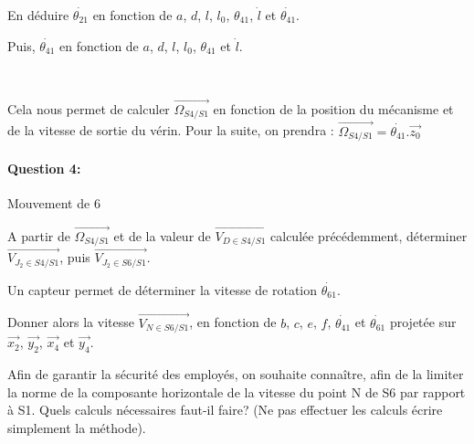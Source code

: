 En déduire $\dot{\theta_{21}}$ en fonction de $a$, $d$, $l$, $l_0$, $\theta_{41}$, $\dot{l}$ et $\dot{\theta_{41}}$.

Puis, $\dot{\theta_{41}}$ en fonction de $a$, $d$, $l$, $l_0$, $\theta_{41}$ et $\dot{l}$.

~\

Cela nous permet de calculer $\overrightarrow{\Omega_{S4/S1}}$ en fonction de la position du mécanisme et de la vitesse de sortie du vérin. Pour la suite, on prendra : $\overrightarrow{\Omega_{S4/S1}}=\dot{\theta_{41}}.\overrightarrow{z_0}$

\paragraph{Question 4:} Mouvement de 6

A partir de $\overrightarrow{\Omega_{S4/S1}}$ et de la valeur de $\overrightarrow{V_{D \in S4/S1}}$ calculée précédemment, déterminer $\overrightarrow{V_{J_2 \in S4/S1}}$, puis $\overrightarrow{V_{J_2 \in S6/S1}}$.

Un capteur permet de déterminer la vitesse de rotation $\dot{\theta_{61}}$.

Donner alors la vitesse $\overrightarrow{V_{N \in S6/S1}}$, en fonction de $b$, $c$, $e$, $f$, $\dot{\theta_{41}}$ et $\dot{\theta_{61}}$ projetée sur $\overrightarrow{x_2}$, $\overrightarrow{y_2}$, $\overrightarrow{x_4}$ et $\overrightarrow{y_4}$.

Afin de garantir la sécurité des employés, on souhaite connaître, afin de la limiter la norme de la composante horizontale de la vitesse du point N de S6 par rapport à S1. Quels calculs nécessaires faut-il faire? (Ne pas effectuer les calculs écrire simplement la méthode).

